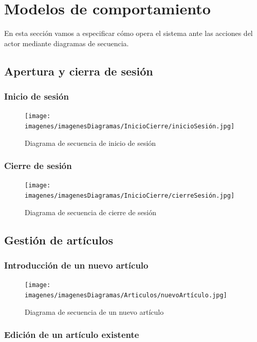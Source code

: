 \newpage


\section{Modelos de comportamiento}

En esta sección vamos a especificar cómo opera el sistema ante las acciones del actor mediante diagramas de secuencia. 

\subsection{Apertura y cierra de sesión}

\subsubsection{Inicio de sesión}

\begin{figure}[H]
	\centering
	\texttt{[image: imagenes/imagenesDiagramas/InicioCierre/inicioSesión.jpg]}
	\caption{Diagrama de secuencia de inicio de sesión}
	\label{fig:seqdiag1}
\end{figure}

\subsubsection{Cierre de sesión}

\begin{figure}[H]
	\centering
	\texttt{[image: imagenes/imagenesDiagramas/InicioCierre/cierreSesión.jpg]}
	\caption{Diagrama de secuencia de cierre de sesión}
	\label{fig:seqdiag2}
\end{figure}

\subsection{Gestión de artículos}

\subsubsection{Introducción de un nuevo artículo}

\begin{figure}[H]
	\centering
	\texttt{[image: imagenes/imagenesDiagramas/Articulos/nuevoArtículo.jpg]}
	\caption{Diagrama de secuencia de un nuevo artículo}
	\label{fig:seqdiag3}
\end{figure}

\subsubsection{Edición de un artículo existente}

